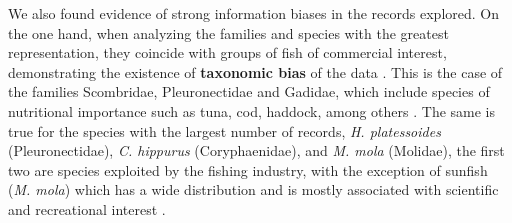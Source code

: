 \documentclass[12pt,authoryear]{elsarticle}
\begin{document}
We also found evidence of strong information biases in the records explored. On the one hand, when analyzing the families and species with the greatest representation, they coincide with groups of fish of commercial interest, demonstrating the existence of \textbf{taxonomic bias }of the data \citep{melo2020}. This is the case of the families Scombridae, Pleuronectidae and Gadidae, which include species of nutritional importance such as tuna, cod, haddock, among others \citep{cohen1990}. The same is true for the species with the largest number of records, \textit{H. platessoides} (Pleuronectidae), \textit{C. hippurus }(Coryphaenidae), and \textit{M. mola} (Molidae), the first two are species exploited by the fishing industry, with the exception of sunfish (\textit{M. mola}) which has a wide distribution and is mostly associated with scientific and recreational interest \citep{pope2010}.
\end{document}

